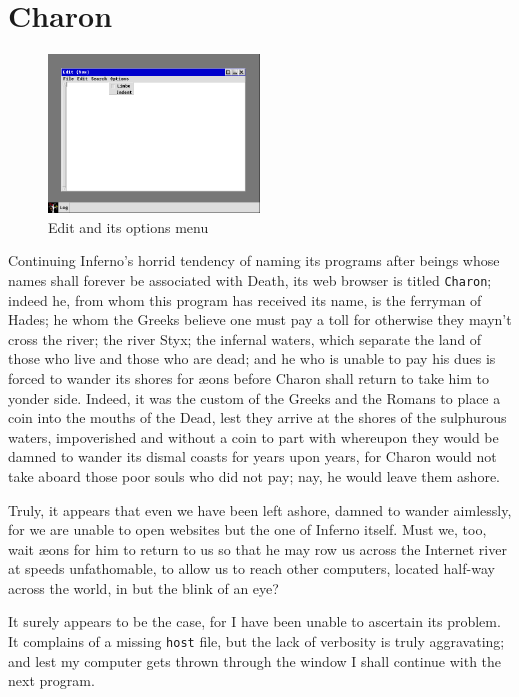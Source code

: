 \documentclass[a5paper,twoside,12pt]{report}
\begin{document}
    \section*{Charon}

    \begin{figure}
      \centering
      \includegraphics[width=0.5\textwidth]{imgs/edit.png}
      \caption{Edit and its options menu}
    \end{figure}

    Continuing Inferno's horrid tendency of naming its programs after beings whose names shall forever be associated with Death, its web browser is titled \texttt{Charon}; indeed he, from whom this program has received its name, is the ferryman of Hades; he whom the Greeks believe one must pay a toll for otherwise they mayn't cross the river; the river Styx; the infernal waters, which separate the land of those who live and those who are dead; and he who is unable to pay his dues is forced to wander its shores for æons before Charon shall return to take him to yonder side. Indeed, it was the custom of the Greeks and the Romans to place a coin into the mouths of the Dead, lest they arrive at the shores of the sulphurous waters, impoverished and without a coin to part with whereupon they would be damned to wander its dismal coasts for years upon years, for Charon would not take aboard those poor souls who did not pay; nay, he would leave them ashore.

    Truly, it appears that even we have been left ashore, damned to wander aimlessly, for we are unable to open websites but the one of Inferno itself. Must we, too, wait æons for him to return to us so that he may row us across the Internet river at speeds unfathomable, to allow us to reach other computers, located half-way across the world, in but the blink of an eye?


    It surely appears to be the case, for I have been unable to ascertain its problem. It complains of a missing \texttt{host} file, but the lack of verbosity is truly aggravating; and lest my computer gets thrown through the window I shall continue with the next program.
\end{document}
